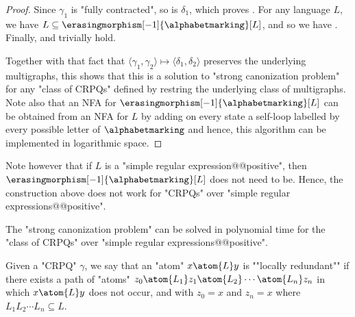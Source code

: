 \begin{proof}
	Since $\gamma_1$ is "fully contracted", so is $\delta_1$, which proves \axiomCanonContracted{}.
	For any language $L$, we have $L \subseteq \erasingmorphism[-1]{\alphabetmarking}[L]$, and so we have \axiomCanonContainment{}.
	Finally, \axiomCanonNonRed{} and \axiomCanonMarking{} trivially hold.
	
	Together with that fact that
	$\langle \gamma_1,\gamma_2 \rangle \mapsto \langle \delta_1, \delta_2\rangle$ preserves
	the underlying multigraphs, this shows that this is a solution to "strong canonization problem"
	for any "class of CRPQs" defined by restring the underlying class of multigraphs.
	Note also that an NFA for $\erasingmorphism[-1]{\alphabetmarking}[L]$ can be obtained
	from an NFA for $L$ by adding on every state a self-loop labelled by every possible letter of $\alphabetmarking$
	and hence, this algorithm can be implemented in logarithmic space.
\end{proof}

Note however that if $L$ is a "simple regular expression@@positive", then
$\erasingmorphism[-1]{\alphabetmarking}[L]$ does not need to be.
Hence, the construction above does not work for "CRPQs" over "simple regular expressions@@positive".

\begin{lemma}
	\AP\label{lem:canonization-SREs}
	The "strong canonization problem" can be solved in polynomial time
	for the "class of CRPQs" over "simple regular expressions@@positive".
\end{lemma}

Given a "CRPQ" $\gamma$, we say that an "atom" $x\atom{L} y$ is \AP""locally redundant"" if
there exists a path of "atoms" $z_0 \atom{L_1} z_1 \atom{L_2} \cdots \atom{L_n} z_n$
in which $x\atom{L} y$ does not occur, and with $z_0 = x$ and $z_n = x$
where $L_1 L_2\cdots L_n \subseteq L$.

